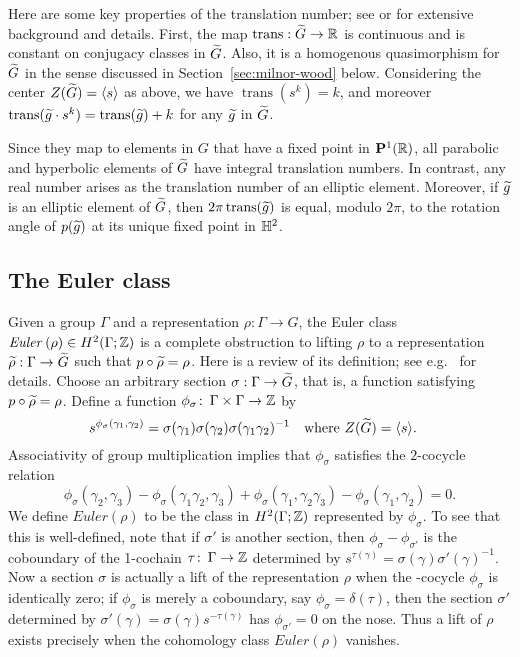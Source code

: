 \documentclass[tikz, sepfignums, defaultenums]{nmd/article}
\newcommand{\G}{G}
\newcommand{\projsp}{\P}
\DeclareMathOperator{\trans}{trans}
\newcommand{\euler}[1]{\mathit{Euler}\left(#1\right)}
\begin{document}
Here are some key properties of the translation number; see \cite[\S
5]{Ghys2001} or \cite[\S 2.3.3]{Calegari2009} for extensive background
and details.  First, the map $\trans:\Gtil\to\R$ is continuous and is
constant on conjugacy classes in $\Gtil$.  Also, it is a homogenous
quasimorphism for $\Gtil$ in the sense discussed in
Section~\ref{sec:milnor-wood} below.  Considering the center
$Z(\Gtil) = \pair{s}$ as above, we have $\trans(s^k) = k$, and
moreover $\trans(\gtil \cdot s^k) = \trans(\gtil) + k$ for any $\gtil$
in $\Gtil$.

Since they map to elements in $G$ that have a fixed point in
$\projsp^1(\R)$, all parabolic and hyperbolic elements of $\Gtil$ have
integral translation numbers.  In contrast, any real number arises
as the translation number of an elliptic element. Moreover, if $\gtil$
is an elliptic element of $\Gtil$, then $2 \pi \trans(\gtil)$ is equal,
modulo $2\pi$, to the rotation angle of $p(\gtil)$ at its unique fixed
point in ${\mathbb{H}}^2$.

\subsection{The Euler class}
\label{sec:euler}

Given a group $\Gamma$ and a representation $\rho:\Gamma\to \G$, the
Euler class $\euler{\rho}\in H^2(\Gamma; \Z)$ is a complete
obstruction to lifting $\rho$ to a representation
$\rhotil:\Gamma\to\Gtil$ such that $p\circ\rhotil = \rho$.  Here is a
review of its definition; see e.g.~\cite[\S 6.2]{Ghys2001} for
details. Choose an arbitrary section $\sigma:\Gamma\to\Gtil$, that is,
a function satisfying $p\circ\rhotil = \rho$.  Define a
function $\phi_\sigma \colon\thinspace \Gamma\times\Gamma\to {\mathbb Z}$ by
$$
s^{\phi_\sigma(\gamma_1, \gamma_2)} =
\sigma(\gamma_1)\sigma(\gamma_2)\sigma(\gamma_1\gamma_2)^{-1}
\mtext{where $Z(\Gtil) = \pair{s}$.}
$$
Associativity of group multiplication implies that
$\phi_\sigma$ satisfies the $2$-cocycle relation
$$
\phi_\sigma(\gamma_2,\gamma_3) - \phi_\sigma(\gamma_1\gamma_2, \gamma_3)
+ \phi_\sigma(\gamma_1, \gamma_2\gamma_3) - \phi_\sigma(\gamma_1, \gamma_2) = 0 .
$$
We define $\euler{\rho}$ to be the class in $H^2(\Gamma; {\mathbb Z})$
represented by $\phi_\sigma$.  To see that this is well-defined, note
that if $\sigma'$ is another section, then
$\phi_\sigma - \phi_{\sigma'}$ is the coboundary of the 1-cochain
$\tau \colon\thinspace \Gamma \to {\mathbb Z}$ determined by
$s^{\tau(\gamma)} = \sigma(\gamma) \sigma'(\gamma)^{-1}$.  Now a
section $\sigma$ is actually a lift of the representation $\rho$ when
the \2-cocycle $\phi_\sigma$ is identically zero; if $\phi_\sigma$ is
merely a coboundary, say $\phi_\sigma = \delta(\tau)$, then the
section $\sigma'$ determined by
$\sigma'(\gamma) = \sigma(\gamma) s^{-\tau(\gamma)}$ has
$\phi_{\sigma'} = 0$ on the nose. Thus a lift of $\rho$ exists
precisely when the cohomology class $\euler{\rho}$ vanishes.
\end{document}
